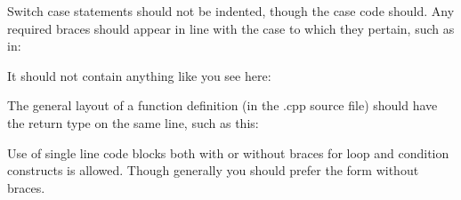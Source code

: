 \begin{DoxyItemize}
\item Switch case statements should not be indented, though the case code should. Any required braces should appear in line with the case to which they pertain, such as in\+: 
\begin{DoxyCode}{0}
\DoxyCodeLine{\{}
\DoxyCodeLine{    \textcolor{keywordflow}{break};}
\DoxyCodeLine{}
\DoxyCodeLine{\{}
\DoxyCodeLine{    \textcolor{keywordflow}{break};}
\DoxyCodeLine{\}}
\DoxyCodeLine{\}}
\end{DoxyCode}
 It should not contain anything like you see here\+: 
\begin{DoxyCode}{0}
\DoxyCodeLine{\{}
\DoxyCodeLine{        \textcolor{keywordflow}{break};}
\DoxyCodeLine{}
\DoxyCodeLine{        \{}
\DoxyCodeLine{            \textcolor{keywordflow}{break};}
\DoxyCodeLine{        \}}
\DoxyCodeLine{\}}
\end{DoxyCode}

\item The general layout of a function definition (in the .cpp source file) should have the return type on the same line, such as this\+: 
\begin{DoxyCode}{0}
\DoxyCodeLine{\{}
\DoxyCodeLine{\}}
\end{DoxyCode}

\item Use of single line code blocks both with or without braces for loop and condition constructs is allowed. Though generally you should prefer the form without braces. 
\begin{DoxyCode}{0}
\DoxyCodeLine{\textcolor{comment}{// This is preferred}}
\DoxyCodeLine{}
\DoxyCodeLine{\textcolor{comment}{// Though this is fine, also}}
\DoxyCodeLine{\{}
\DoxyCodeLine{\}}
\end{DoxyCode}


\end{DoxyItemize}
